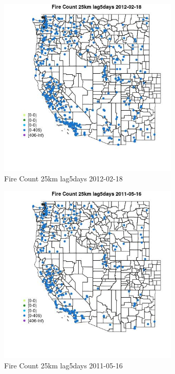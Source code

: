 \begin{figure} 
\centering  
\includegraphics[width=0.77\textwidth]{Code_Outputs/Report_ML_input_PM25_Step4_part_f_de_duplicated_aves_prioritize_24hr_obswNAs_MapObsFire_Count_25km_lag5days2012-02-18.jpg} 
\caption{\label{fig:Report_ML_input_PM25_Step4_part_f_de_duplicated_aves_prioritize_24hr_obswNAsMapObsFire_Count_25km_lag5days2012-02-18}Fire Count 25km lag5days 2012-02-18} 
\end{figure} 
 

\clearpage 

\begin{figure} 
\centering  
\includegraphics[width=0.77\textwidth]{Code_Outputs/Report_ML_input_PM25_Step4_part_f_de_duplicated_aves_prioritize_24hr_obswNAs_MapObsFire_Count_25km_lag5days2011-05-16.jpg} 
\caption{\label{fig:Report_ML_input_PM25_Step4_part_f_de_duplicated_aves_prioritize_24hr_obswNAsMapObsFire_Count_25km_lag5days2011-05-16}Fire Count 25km lag5days 2011-05-16} 
\end{figure} 
 

